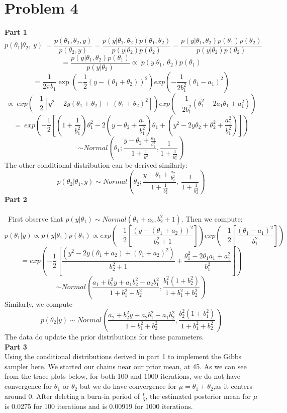 \documentclass[10pt,a4paper]{article}
\begin{document}
\section*{Problem 4}
\textbf{Part 1}
$$
p(\theta_{1}|\theta_{2},\ y)\ =\frac{p(\theta_{1},\theta_{2},y)}{p(\theta_{2},y)}
=\frac{p(y|\theta_{1},\theta_{2})p(\theta_{1},\theta_{2})}{p(y|\theta_{2})p(\theta_{2})}
=\frac{p(y|\theta_{1},\theta_{2})p(\theta_{1})p(\theta_{2})}{p(y|\theta_{2})p(\theta_{2})}
$$
$$
=\frac{p(y|\theta_{1},\theta_{2})p(\theta_{1})}{p(y|\theta_{2})}
\propto\ p(y|\theta_{1},\ \theta_{2})p(\theta_{1})
$$
$$=\frac{1}{2\pi b_1}\exp(-\frac{1}{2}(y-(\theta_{1}+\theta_{2}))^{2})exp(-\frac{1}{2b_{1}^{2}}(\theta_{1}-a_{1})^{2})$$
$$
\propto\ exp(-\frac{1}{2}[y^{2}-2y(\theta_{1}+\theta_{2})+(\theta_{1}+\theta_{2})^{2}])exp(-\frac{1}{2b_{1}^{2}}(\theta_{1}^{2}-2a_{1}\theta_{1}+a_{1}^{2}))
$$
$$
=\ exp(-\frac{1}{2}[(1+\frac{1}{b_{1}^{2}})\theta_{1}^{2}-2(y-\theta_{2}+\frac{a_{1}}{b_{1}^{2}})\theta_{1}+(y^{2}-2y\theta_{2}+\theta_{2}^{2}+\frac{a_{1}^{2}}{b_{1}^{2}})])
$$
$$\sim Normal(\displaystyle \theta_{1};\frac{y-\theta_{2}+\frac{a_{1}}{b_{1}^{2}}}{1+\frac{1}{b_{1}^{2}}},\frac{1}{1+\frac{1}{b_{1}^{2}}})
$$
The other conditional distribution can be derived similarly:
$$
p(\theta_{2}|\theta_{1},y) 
\sim Normal(\displaystyle \theta_{2};\frac{y-\theta_{1}+\frac{a_{2}}{b_{2}^{2}}}{1+\frac{1}{b_{2}^{2}}},\ \frac{1}{1+\frac{1}{b_{2}^{2}}})$$
\textbf{Part 2}\\
\\\
First observe that $p(y|\theta_1) \sim Normal(\theta_1+a_2,b_2^2+1)$. Then we compute:\\
$$
p(\theta_{1}|y) \propto p(y|\theta_1)p(\theta_1)
\propto exp(-\frac{1}{2}[\frac{(y-(\theta_1+a_2))^2}{b_2^2+1}])exp(-\frac{1}{2}[\frac{(\theta_1-a_1)^2}{b_1^2}])$$
$$
= exp(-\frac{1}{2}[\frac{(y^2-2y(\theta_1+a_2)+(\theta_1+a_2)^2)}{b_2^2+1}+\frac{\theta_1^2-2\theta_1 a_1+a_1^2}{b_1^2}])
$$
$$
\sim Normal(\frac{a_{1}+b_{1}^{2}y+a_{1}b_{2}^{2}-a_{2}b_{1}^{2}}{1+b_{1}^{2}+b_{2}^{2}}, \frac{b_{1}^{2}(1+b_{2}^{2})}{1+b_{1}^{2}+b_{2}^{2}})
$$
Similarly, we compute \\
$$ p(\theta_{2}|y) \sim Normal(\frac{a_{2}+b_{2}^{2}y+a_{2}b_{1}^{2}-a_{1}b_{2}^{2}}{1+b_{1}^{2}+b_{2}^{2}}, \frac{b_{2}^{2}(1+b_{1}^{2})}{1+b_{1}^{2}+b_{2}^{2}})$$
The data do update the prior distributions for these parameters.\\
\textbf{Part 3}\\
Using the conditional distributions derived in part 1 to implement the Gibbs sampler here. We started our chains near our prior mean, at 45. As we can see from the trace plots below, for both 100 and 1000 iterations, we do not have convergence for $\theta_1$ or $\theta_2$ but we do have convergence for $\mu=\theta_1+\theta_2$,as it centers around 0. After deleting a burn-in period of $\frac{t}{5}$, the estimated posterior mean for $\mu$ is 0.0275 for 100 iterations and is 0.00919 for 1000 iterations. \\
\end{document}
